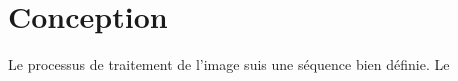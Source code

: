 \documentclass[a4paper , 12pt]{article}
\begin{document}
  \section{Conception}
  Le processus de traitement de l'image suis une séquence bien définie. Le
  \section{}
\end{document}
